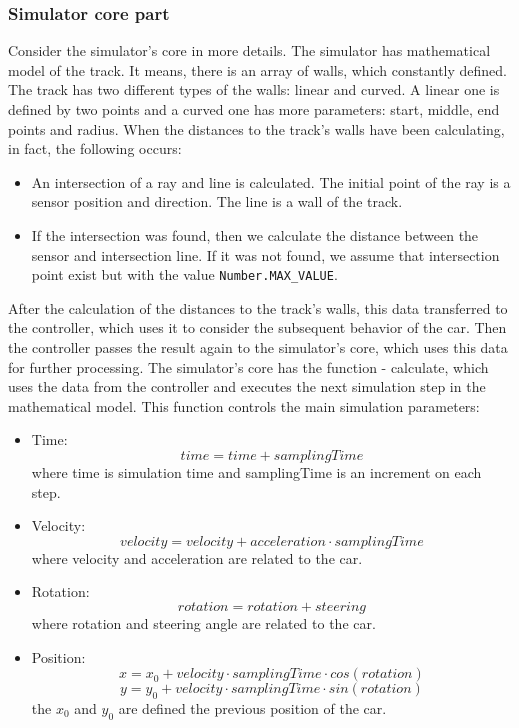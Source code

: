 \subsubsection{Simulator core part}
Consider the simulator's core in more details. The simulator has mathematical model of the track. It means, there is an array of walls, which constantly defined. The track has two different types of the walls: linear and curved. A linear one is defined by two points and a curved one has more parameters: start, middle, end points and radius. When the distances to the track's walls have been calculating, in fact, the following occurs:
\begin{itemize}
    \item An intersection of a ray and line is calculated. The initial point of the ray is a sensor position and direction. The line is a wall of the track.
    \item If the intersection was found, then we calculate the distance between the sensor and intersection line. If it was not found, we assume that intersection point exist but with the value \texttt{Number.MAX\_VALUE}.
\end{itemize}
After the calculation of the distances to the track's walls, this data transferred to the controller, which uses it to consider the subsequent behavior of the car. Then the controller passes the result again to the simulator's core, which uses this data for further processing. The simulator's core has the function - calculate, which uses the data from the controller and executes the next simulation step in the mathematical model. This function controls the main simulation parameters:
\begin{itemize}
    \item Time:
        \begin{equation}
            time = time + samplingTime
        \end{equation} \newline
        where time is simulation time and samplingTime is an increment on each step. 
    \item Velocity:
    \begin{equation}
        velocity = velocity + acceleration \cdot samplingTime
    \end{equation} \newline
        where velocity and acceleration are related to the car.
    \item Rotation:
    \begin{equation}
        rotation = rotation + steering
    \end{equation} \newline
        where rotation and steering angle are related to the car.
    \item Position:
    \begin{equation}
        x = x_0 + velocity \cdot samplingTime \cdot cos(rotation)
    \end{equation}
    \begin{equation}
        y = y_0 + velocity \cdot samplingTime \cdot sin(rotation)
    \end{equation} \newline
    the $x_0$ and $y_0$ are defined the previous position of the car.
\end{itemize}
